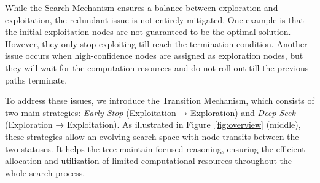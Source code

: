
While the Search Mechanism ensures a balance between exploration and exploitation, the redundant issue is not entirely mitigated. 
One example is that the initial exploitation nodes are not guaranteed to be the optimal solution. However, they only stop exploiting till reach the termination condition. 
Another issue occurs when high-confidence nodes are assigned as exploration nodes, but they will wait for the computation resources and do not roll out till the previous paths terminate. 

To address these issues, we introduce the Transition Mechanism, which consists of two main strategies: \textit{Early Stop} (Exploitation → Exploration) and \textit{Deep Seek} (Exploration → Exploitation). As illustrated in Figure~\ref{fig:overview} (middle), these strategies allow an evolving search space with node transits between the two statuses. 
It helps the tree maintain focused reasoning, ensuring the efficient allocation and utilization of limited computational resources throughout the whole search process. 

